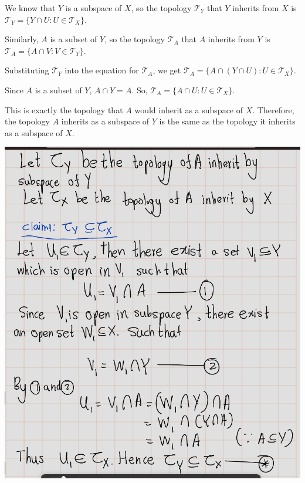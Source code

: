 \documentclass[
]{book}
\theoremstyle{definition}
\theoremstyle{definition}
\theoremstyle{definition}
\theoremstyle{definition}
\theoremstyle{remark}
\begin{document}
We know that \(Y\) is a subspace of \(X\), so the topology \(\mathcal{T}_Y\) that \(Y\) inherits from \(X\) is \(\mathcal{T}_Y = \{ Y \cap U : U \in \mathcal{T}_X \}\).

Similarly, \(A\) is a subset of \(Y\), so the topology \(\mathcal{T}_A\) that \(A\) inherits from \(Y\) is \(\mathcal{T}_A = \{ A \cap V : V \in \mathcal{T}_Y \}\).

Substituting \(\mathcal{T}_Y\) into the equation for \(\mathcal{T}_A\), we get \(\mathcal{T}_A = \{ A \cap (Y \cap U) : U \in \mathcal{T}_X \}\).

Since \(A\) is a subset of \(Y\), \(A \cap Y = A\). So, \(\mathcal{T}_A = \{ A \cap U : U \in \mathcal{T}_X \}\).

This is exactly the topology that \(A\) would inherit as a subspace of \(X\). Therefore, the topology \(A\) inherits as a subspace of \(Y\) is the same as the topology it inherits as a subspace of \(X\).

\includegraphics{figures/Exercises/Ex 2.16/ex1-1.png}
\end{document}
